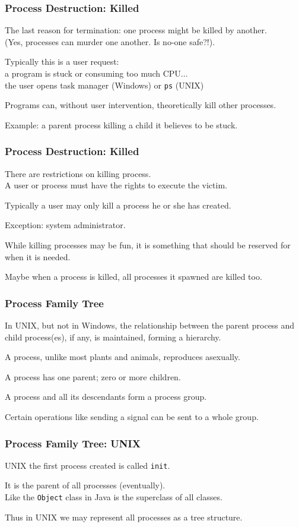 \begin{frame}
\frametitle{Process Destruction: Killed}

The last reason for termination: one process might be killed by another.\\
\quad (Yes, processes can murder one another. Is no-one safe?!). 

Typically this is a user request:\\
\quad a program is stuck or consuming too much CPU...\\
\quad the user opens task manager (Windows) or \texttt{ps} (UNIX)

Programs can, without user intervention, theoretically kill other processes. 

Example: a parent process killing a child it believes to be stuck.

\end{frame}

\begin{frame}
\frametitle{Process Destruction: Killed}

There are restrictions on killing process.\\
\quad A user or process must have the rights to execute the victim. 

Typically a user may only kill a process he or she has created.

Exception: system administrator. 

While killing processes may be fun, it is something that should be reserved for when it is needed.

Maybe when a process is killed, all processes it spawned are killed too.


\end{frame}


\begin{frame}
\frametitle{Process Family Tree}
In UNIX, but not in Windows, the relationship between the parent process and child process(es), if any, is maintained, forming a hierarchy.

A process, unlike most plants and animals, reproduces asexually.

A process has one parent; zero or more children.

A process and all its descendants form a \alert{process group}.

Certain operations like sending a signal can be sent to a whole group.

\end{frame}

\begin{frame}
\frametitle{Process Family Tree: UNIX}
UNIX the first process created is called \texttt{init}.

It is the parent of all processes (eventually).\\
\quad Like the \texttt{Object} class in Java is the superclass of all classes.

Thus in UNIX we may represent all processes as a tree structure.

\end{frame}

